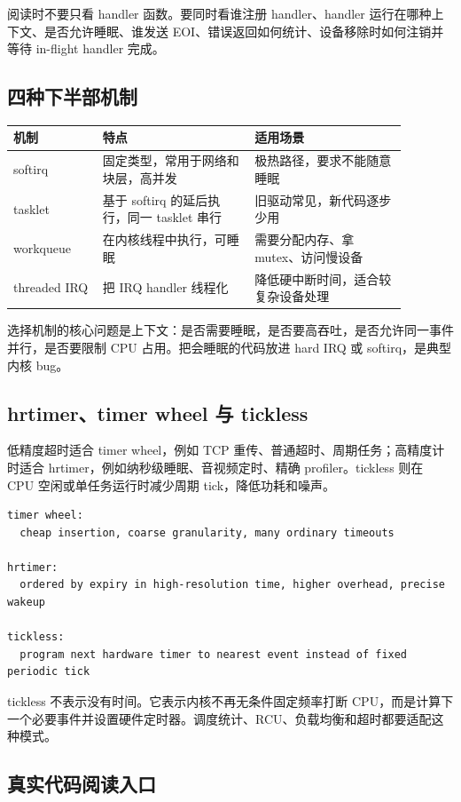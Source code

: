 阅读时不要只看 handler 函数。要同时看谁注册 handler、handler 运行在哪种上下文、是否允许睡眠、谁发送 EOI、错误返回如何统计、设备移除时如何注销并等待 in-flight handler 完成。

\subsection{四种下半部机制}

\begin{longtable}{p{0.2\linewidth}p{0.34\linewidth}p{0.34\linewidth}}
\toprule
机制 & 特点 & 适用场景 \\
\midrule
softirq & 固定类型，常用于网络和块层，高并发 & 极热路径，要求不能随意睡眠 \\
tasklet & 基于 softirq 的延后执行，同一 tasklet 串行 & 旧驱动常见，新代码逐步少用 \\
workqueue & 在内核线程中执行，可睡眠 & 需要分配内存、拿 mutex、访问慢设备 \\
threaded IRQ & 把 IRQ handler 线程化 & 降低硬中断时间，适合较复杂设备处理 \\
\bottomrule
\end{longtable}

选择机制的核心问题是上下文：是否需要睡眠，是否要高吞吐，是否允许同一事件并行，是否要限制 CPU 占用。把会睡眠的代码放进 hard IRQ 或 softirq，是典型内核 bug。

\subsection{hrtimer、timer wheel 与 tickless}

低精度超时适合 timer wheel，例如 TCP 重传、普通超时、周期任务；高精度计时适合 hrtimer，例如纳秒级睡眠、音视频定时、精确 profiler。tickless 则在 CPU 空闲或单任务运行时减少周期 tick，降低功耗和噪声。

\begin{lstlisting}
timer wheel:
  cheap insertion, coarse granularity, many ordinary timeouts

hrtimer:
  ordered by expiry in high-resolution time, higher overhead, precise wakeup

tickless:
  program next hardware timer to nearest event instead of fixed periodic tick
\end{lstlisting}

tickless 不表示没有时间。它表示内核不再无条件固定频率打断 CPU，而是计算下一个必要事件并设置硬件定时器。调度统计、RCU、负载均衡和超时都要适配这种模式。

\subsection{真实代码阅读入口}

